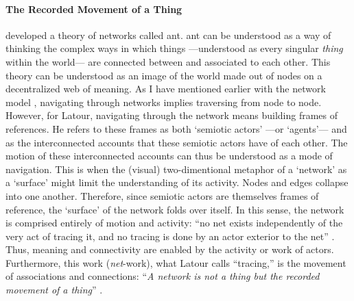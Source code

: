 \paragraph{The Recorded Movement of a Thing}
\textcite{Lat90:On, Lat93:We} developed a theory of networks called \gls{ant}. \gls{ant} can be understood as a way of thinking the complex ways in which things ---understood as every singular \textit{thing} within the world--- are connected between and associated to each other. This theory can be understood as an image of the world made out of nodes on a decentralized web of meaning. As I have mentioned earlier with the network model , navigating through networks implies traversing from node to node. However, for Latour, navigating through the network means building frames of references. He refers to these frames as both `semiotic actors' ---or `agents'--- and as the interconnected accounts that these semiotic actors have of each other. The motion of these interconnected accounts can thus be understood as a mode of navigation. This is when the (visual) two-dimentional metaphor of a `network' as a `surface' might limit the understanding of its activity. Nodes and edges collapse into one another. Therefore, since semiotic actors are themselves frames of reference, the `surface' of the network folds over itself. In this sense, the network is comprised entirely of motion and activity: ``no net exists independently of the very act of tracing it, and no tracing is done by an actor exterior to the net'' \parencite[14]{Lat90:On}. Thus, meaning and connectivity are enabled by the activity or work of actors. Furthermore, this work (\textit{net}-work), what Latour calls ``tracing,'' is the movement of associations and connections: ``\textit{A network is not a thing but the recorded movement of a thing}'' \im \parencite[14]{Lat90:On}.
 
